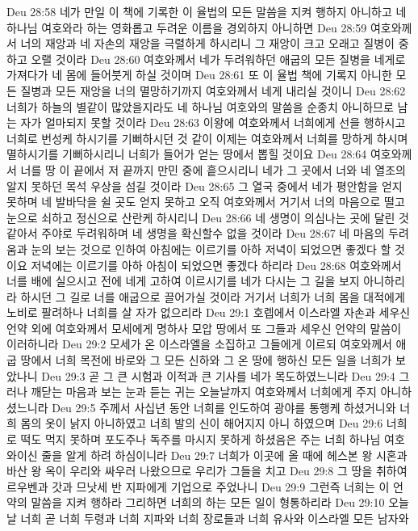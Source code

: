 Deu 28:58  네가 만일 이 책에 기록한 이 율법의 모든 말씀을 지켜 행하지 아니하고 네 하나님 여호와라 하는 영화롭고 두려운 이름을 경외하지 아니하면
Deu 28:59  여호와께서 너의 재앙과 네 자손의 재앙을 극렬하게 하시리니 그 재앙이 크고 오래고 질병이 중하고 오랠 것이라
Deu 28:60  여호와께서 네가 두려워하던 애굽의 모든 질병을 네게로 가져다가 네 몸에 들어붓게 하실 것이며
Deu 28:61  또 이 율법 책에 기록지 아니한 모든 질병과 모든 재앙을 너의 멸망하기까지 여호와께서 네게 내리실 것이니
Deu 28:62  너희가 하늘의 별같이 많았을지라도 네 하나님 여호와의 말씀을 순종치 아니하므로 남는 자가 얼마되지 못할 것이라
Deu 28:63  이왕에 여호와께서 너희에게 선을 행하시고 너희로 번성케 하시기를 기뻐하시던 것 같이 이제는 여호와께서 너희를 망하게 하시며 멸하시기를 기뻐하시리니 너희가 들어가 얻는 땅에서 뽑힐 것이요
Deu 28:64  여호와께서 너를 땅 이 끝에서 저 끝까지 만민 중에 흩으시리니 네가 그 곳에서 너와 네 열조의 알지 못하던 목석 우상을 섬길 것이라
Deu 28:65  그 열국 중에서 네가 평안함을 얻지 못하며 네 발바닥을 쉴 곳도 얻지 못하고 오직 여호와께서 거기서 너의 마음으로 떨고 눈으로 쇠하고 정신으로 산란케 하시리니
Deu 28:66  네 생명이 의심나는 곳에 달린 것 같아서 주야로 두려워하며 네 생명을 확신할수 없을 것이라
Deu 28:67  네 마음의 두려움과 눈의 보는 것으로 인하여 아침에는 이르기를 아하 저녁이 되었으면 좋겠다 할 것이요 저녁에는 이르기를 아하 아침이 되었으면 좋겠다 하리라
Deu 28:68  여호와께서 너를 배에 실으시고 전에 네게 고하여 이르시기를 네가 다시는 그 길을 보지 아니하리라 하시던 그 길로 너를 애굽으로 끌어가실 것이라 거기서 너희가 너희 몸을 대적에게 노비로 팔려하나 너희를 살 자가 없으리라
Deu 29:1  호렙에서 이스라엘 자손과 세우신 언약 외에 여호와께서 모세에게 명하사 모압 땅에서 또 그들과 세우신 언약의 말씀이 이러하니라
Deu 29:2  모세가 온 이스라엘을 소집하고 그들에게 이르되 여호와께서 애굽 땅에서 너희 목전에 바로와 그 모든 신하와 그 온 땅에 행하신 모든 일을 너희가 보았나니
Deu 29:3  곧 그 큰 시험과 이적과 큰 기사를 네가 목도하였느니라
Deu 29:4  그러나 깨닫는 마음과 보는 눈과 듣는 귀는 오늘날까지 여호와께서 너희에게 주지 아니하셨느니라
Deu 29:5  주께서 사십년 동안 너희를 인도하여 광야를 통행케 하셨거니와 너희 몸의 옷이 낡지 아니하였고 너희 발의 신이 해어지지 아니 하였으며
Deu 29:6  너희로 떡도 먹지 못하며 포도주나 독주를 마시지 못하게 하셨음은 주는 너희 하나님 여호와이신 줄을 알게 하려 하심이니라
Deu 29:7  너희가 이곳에 올 때에 헤스본 왕 시혼과 바산 왕 옥이 우리와 싸우러 나왔으므로 우리가 그들을 치고
Deu 29:8  그 땅을 취하여 르우벤과 갓과 므낫세 반 지파에게 기업으로 주었나니
Deu 29:9  그런즉 너희는 이 언약의 말씀을 지켜 행하라 그리하면 너희의 하는 모든 일이 형통하리라
Deu 29:10  오늘날 너희 곧 너희 두령과 너희 지파와 너희 장로들과 너희 유사와 이스라엘 모든 남자와
